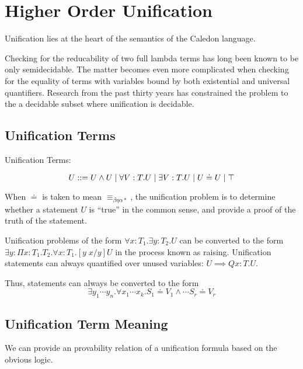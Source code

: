 \section{Higher Order Unification}

Unification lies at the heart of the semantics of the Caledon language.

Checking for the reducability of two full lambda terms has long been known to be only semidecidable.  
The matter becomes even more complicated when checking for the equality of terms with variables bound
by both existential and universal quantifiers.  Research from the past thirty years has constrained
the problem to the a decidable subset where unification is decidable. 

\subsection{Unification Terms}

\begin{definition}
Unification Terms:

\[
U ::= U \wedge U 
 \; | \; \forall V : T . U
 \; | \; \exists V : T . U 
 \; | \; U \doteq U
 \; | \; \top
\]
\label{def:hou:syn}
\end{definition}

When $\doteq$ is taken to mean $\equiv_{\beta\eta\alpha*}$, the unification problem is to determine 
whether a statement $U$ is ``true'' in the common sense, and provide a proof of the truth of the statement. 

Unification problems of the form 
$\forall x : T_1 . \exists y : T_2 . U $ can be converted to the form
$\exists y : \Pi x : T_1 . T_2 . \forall x : T_1 . [y\; x / y ]U $ 
in the process known as raising. Unification
statements can always quantified over unused variables: $U \implies Q x : T . U$.  

Thus, statements can always be converted to the form
\[
\exists y_1 \cdots y_n . \forall x_1 \cdots x_k . S_1 \doteq V_1 \wedge \cdots S_r \doteq V_r
\]




\subsection{Unification Term Meaning}

We can provide an provability relation of a unification formula
based on the obvious logic.

